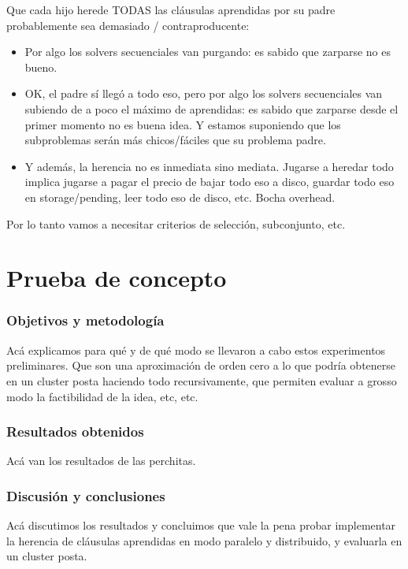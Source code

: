 Que cada hijo herede TODAS las cláusulas aprendidas por su padre probablemente sea demasiado / contraproducente:
\begin{itemize}
\item Por algo los solvers secuenciales van purgando: es sabido que zarparse no es bueno.
\item OK, el padre sí llegó a todo eso, pero por algo los solvers secuenciales van subiendo de a poco el máximo de aprendidas: es sabido que zarparse desde el primer momento no es buena idea. Y estamos suponiendo que los subproblemas serán más chicos/fáciles que su problema padre.
\item Y además, la herencia no es inmediata sino mediata. Jugarse a heredar todo implica jugarse a pagar el precio de bajar todo eso a disco, guardar todo eso en storage/pending, leer todo eso de disco, etc. Bocha overhead.
\end{itemize}

Por lo tanto vamos a necesitar criterios de selección, subconjunto, etc.


\section{Prueba de concepto}

\subsubsection{Objetivos y metodología}

Acá explicamos para qué y de qué modo se llevaron a cabo estos experimentos
preliminares. Que son una aproximación de orden cero a lo que podría obtenerse
en un cluster posta haciendo todo recursivamente, que permiten evaluar a
grosso modo la factibilidad de la idea, etc, etc.

\subsubsection{Resultados obtenidos}

Acá van los resultados de las perchitas.

\subsubsection{Discusión y conclusiones}

Acá discutimos los resultados y concluimos que vale la pena probar implementar
la herencia de cláusulas aprendidas en modo paralelo y distribuido, y
evaluarla en un cluster posta.


